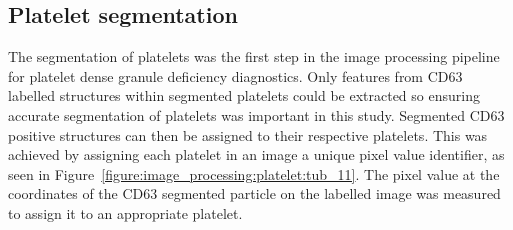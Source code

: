 \subsection{Platelet segmentation}
\label{platelets:image_processing:platelet}
The segmentation of platelets was the first step in the image processing pipeline for platelet dense granule deficiency diagnostics. Only features from CD63 labelled structures within segmented platelets could be extracted so ensuring accurate segmentation of platelets was important in this study. Segmented CD63 positive structures can then be assigned to their respective platelets. This was achieved by assigning each platelet in an image a unique pixel value identifier, as seen in Figure~\ref{figure:image_processing:platelet:tub_11}. The pixel value at the coordinates of the CD63 segmented particle on the labelled image was measured to assign it to an appropriate platelet.

